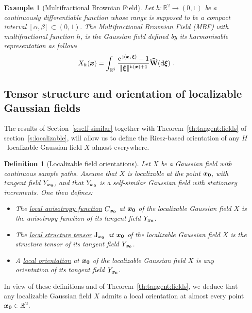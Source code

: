 \documentclass{elsarticle}
\newtheorem{definition}{Definition}
\newtheorem{example}{Example}
\begin{document}
\begin{example}[Multifractional Brownian Field]
\label{ex:MBF}
Let $h:\mathbb{R}^2\to (0,1)$ be a continuously differentiable function whose range is supposed to be a compact interval $[\alpha,\beta]\subset (0,1)$. The Multifractional Brownian Field (MBF) with multifractional function $h$, is the Gaussian field defined by its harmonisable representation as follows
\begin{equation}\label{e:multi}
X_h(\bm{x})=\int_{\mathbb{R}^2}\frac{\mathrm{e}^{\, \mathrm{j} \left \langle \bm{x},\, \bm{\xi}\right \rangle}-1}{\lVert \bm{\xi}\rVert^{h(\bm{x})+1}}\mathbf{\widehat{W}}(\mathop{}\mathopen{}\mathrm{d} \bm{\xi})\;.
\end{equation}
\end{example}



\subsection{Tensor structure and orientation of localizable Gaussian fields\\}\label{s:def-orientation-localizable}

The results of Section~\ref{s:self-similar} together with Theorem~\ref{th:tangent:fields} of section~\ref{s:localizable}, will allow us to define the Riesz-based orientation of any $H$--localizable Gaussian field $X$ almost everywhere.


\begin{definition}[Localizable field orientations]\label{def:localizable_orientation}
Let $X$ be a Gaussian field with continuous sample paths. Assume that $X$ is localizable at the point $\bm{x_0}$, with tangent field $Y_{\bm{x_0}}$, and that $Y_{\bm{x_0}}$ is a self-similar Gaussian field with stationary increments. One then defines:
\begin{itemize}
\item The \underline{local anisotropy function} $C_{\bm{x_0}}$ at $\bm{x_0}$ of the localizable Gaussian field $X$ is the anisotropy function of its tangent field $Y_{\bm{x_0}}$.
\item The  \underline{local structure tensor} $\mathbf{J}_{\bm{x_0}}$ at $\bm{x_0}$ of the localizable Gaussian field $X$ is the structure tensor of its tangent field $Y_{\bm{x_0}}$.
\item A  \underline{local orientation} at $\bm{x_0}$ of the localizable Gaussian field $X$ is any orientation of its tangent field $Y_{\bm{x_0}}$.
\end{itemize}
\end{definition}
In view of these definitions and of Theorem~\ref{th:tangent:fields}, we deduce that any localizable Gaussian field $X$ admits a local orientation at almost every point $\bm{x_0}\in\mathbb{R}^2$. 
\end{document}
